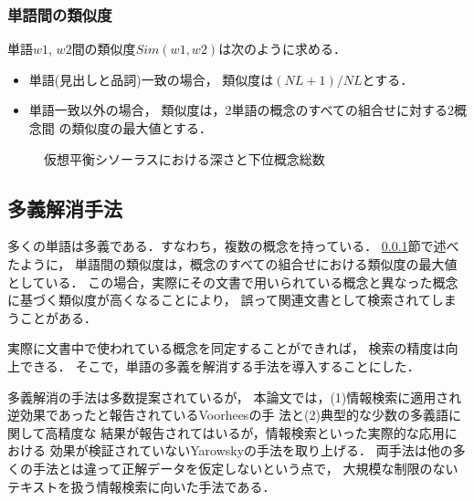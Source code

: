 \subsubsection{単語間の類似度}\label{sec:sim-word-sub}
  単語$w1$, $w2$間の類似度$Sim(w1,w2)$は次のように求める．

\begin{itemize}
\item  単語(見出しと品詞)一致の場合，
       類似度は$(NL+1)/NL$とする．
\item  単語一致以外の場合，
     類似度は，2単語の概念のすべての組合せに対する2概念間
     の類似度の最大値とする．
\end{itemize}

\begin{figure}[ht]
\vspace*{12mm}
 
 \centerline{}
\vspace*{5mm}
 \caption{仮想平衡シソーラスにおける深さと下位概念総数}
 \label{fig:thesaurus_level}
\vspace*{10mm}
\end{figure}



\subsection{多義解消手法}
  多くの単語は多義である．すなわち，複数の概念を持っている．
\ref{sec:sim-word-sub}節で述べたように，
単語間の類似度は，概念のすべての組合せにおける類似度の最大値としている．
この場合，実際にその文書で用いられている概念と異なった概念
に基づく類似度が高くなることにより，
誤って関連文書として検索されてしまうことがある．
 
  実際に文書中で使われている概念を同定することができれば，
検索の精度は向上できる．
  そこで，単語の多義を解消する手法を導入することにした．

多義解消の手法は多数提案されているが，
本論文では，(1)情報検索に適用され逆効果であったと報告されているVoorheesの手
法と(2)典型的な少数の多義語に関して高精度な
結果が報告されてはいるが，情報検索といった実際的な応用における
効果が検証されていないYarowskyの手法を取り上げる．
両手法は他の多くの手法とは違って正解データを仮定しないという点で，
大規模な制限のないテキストを扱う情報検索に向いた手法である．

